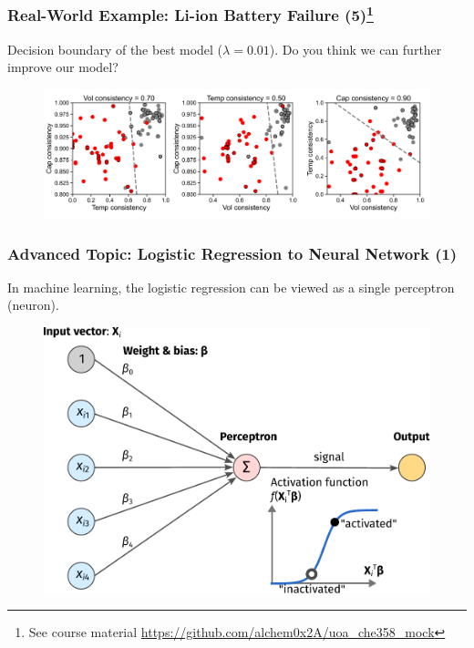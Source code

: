 \documentclass[10pt,aspectratio=169]{beamer}
\begin{document}
      \begin{frame}
        \frametitle{Real-World Example: Li-ion Battery Failure
          (5)\let\thefootnote\relax\footnote{{\scriptsize See course
              material
              \url{https://github.com/alchem0x2A/uoa_che358_mock}}}}

        Decision boundary of the best model ($\lambda = 0.01$). Do you
        think we can further improve our model?

        \begin{figure}
          \includegraphics[width=\textwidth]{scripts/batter_decision.pdf}
        \end{figure}
        
        
      \end{frame}

      \begin{frame}
        \frametitle{Advanced Topic: Logistic Regression to Neural
          Network (1)}
        In machine learning, the logistic regression can be viewed as
        a single perceptron (neuron).

        \begin{figure}[t]
          \includegraphics[width=0.65\linewidth]{images/nn-1.pdf}
        \end{figure}

        
      \end{frame}
\end{document}
